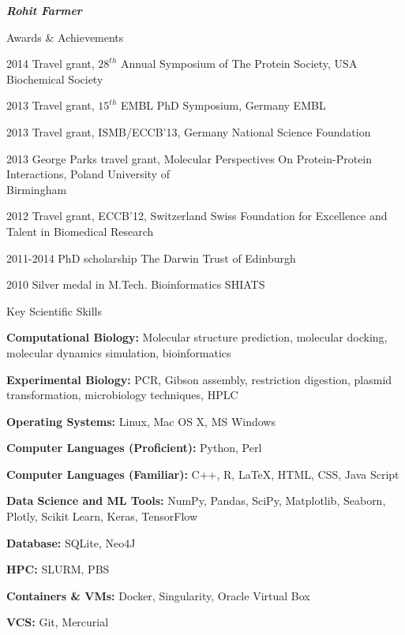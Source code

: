 \documentclass[10pt]{article}
\begin{document}
\begin{cv}{\huge \it \bfseries Rohit Farmer}
\newpage
\begin{cvlist}{Awards \& Achievements}
	\item[2014] Travel grant, $28^{th}$ Annual Symposium of The Protein Society, USA \hfill Biochemical Society
	\item[2013] Travel grant, $15^{th}$ EMBL PhD Symposium, Germany \hfill EMBL
	\item[2013] Travel grant, ISMB/ECCB'13, Germany \hfill National Science Foundation
	\item[2013] George Parks travel grant,  Molecular Perspectives On Protein-Protein Interactions, Poland \hfill University of \\ \hspace*{\fill} Birmingham
	\item[2012] Travel grant, ECCB'12, Switzerland \hfill Swiss Foundation for Excellence and \\ \hspace*{\fill} Talent in Biomedical Research
	\item[2011-2014] PhD scholarship \hfill The Darwin Trust of Edinburgh
	\item[2010] Silver medal in M.Tech. Bioinformatics \hfill SHIATS
\end{cvlist}

\vskip3pt
\begin{cvlist}{Key Scientific Skills}
	\item[\textbf{Computational Biology:}] Molecular structure prediction,	molecular docking, molecular dynamics simulation, bioinformatics
	\item[\textbf{Experimental Biology:}] PCR, Gibson assembly, restriction digestion, plasmid transformation, microbiology techniques, 
	HPLC
	\item[\textbf{Operating Systems:}] Linux, Mac OS X, MS Windows
	\item[\textbf{Computer Languages (Proficient):}] Python, Perl
	\item[\textbf{Computer Languages (Familiar):}] C++, R, \LaTeX, HTML, CSS, Java Script
	\item[\textbf{Data Science and ML Tools:}] NumPy, Pandas, SciPy, Matplotlib, Seaborn, Plotly, Scikit Learn, Keras, TensorFlow
	\item[\textbf{Database:}] SQLite, Neo4J
	\item[\textbf{HPC:}] SLURM, PBS
	\item[\textbf{Containers \& VMs:}] Docker, Singularity, Oracle Virtual Box
	\item[\textbf{VCS:}] Git, Mercurial
\end{cvlist}


\end{cv}
\end{document}
